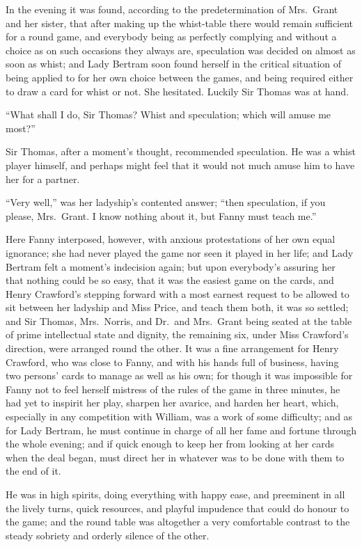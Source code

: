 \documentclass{article}
\begin{document}
In the evening it was found, according to the predetermination
of Mrs.\ Grant and her sister, that after making up
the whist-table there would remain sufficient for a
round game, and everybody being as perfectly complying
and without a choice as on such occasions they always are,
speculation was decided on almost as soon as whist;
and Lady Bertram soon found herself in the critical situation
of being applied to for her own choice between the games,
and being required either to draw a card for whist or not.
She hesitated.  Luckily Sir Thomas was at hand.

``What shall I do, Sir Thomas?  Whist and speculation;
which will amuse me most?''

Sir Thomas, after a moment's thought, recommended speculation.
He was a whist player himself, and perhaps might feel
that it would not much amuse him to have her for a partner.

``Very well,'' was her ladyship's contented answer;
``then speculation, if you please, Mrs.\ Grant.  I know
nothing about it, but Fanny must teach me.''

Here Fanny interposed, however, with anxious protestations
of her own equal ignorance; she had never played the
game nor seen it played in her life; and Lady Bertram
felt a moment's indecision again; but upon everybody's
assuring her that nothing could be so easy, that it
was the easiest game on the cards, and Henry Crawford's
stepping forward with a most earnest request to be allowed
to sit between her ladyship and Miss Price, and teach
them both, it was so settled; and Sir Thomas, Mrs.\ Norris,
and Dr.\ and Mrs.\ Grant being seated at the table of prime
intellectual state and dignity, the remaining six,
under Miss Crawford's direction, were arranged round
the other.  It was a fine arrangement for Henry Crawford,
who was close to Fanny, and with his hands full of business,
having two persons' cards to manage as well as his own;
for though it was impossible for Fanny not to feel herself
mistress of the rules of the game in three minutes,
he had yet to inspirit her play, sharpen her avarice,
and harden her heart, which, especially in any competition
with William, was a work of some difficulty; and as for
Lady Bertram, he must continue in charge of all her fame
and fortune through the whole evening; and if quick enough
to keep her from looking at her cards when the deal began,
must direct her in whatever was to be done with them
to the end of it.

He was in high spirits, doing everything with happy ease,
and preeminent in all the lively turns, quick resources,
and playful impudence that could do honour to the game;
and the round table was altogether a very comfortable
contrast to the steady sobriety and orderly silence of
the other.
\end{document}
